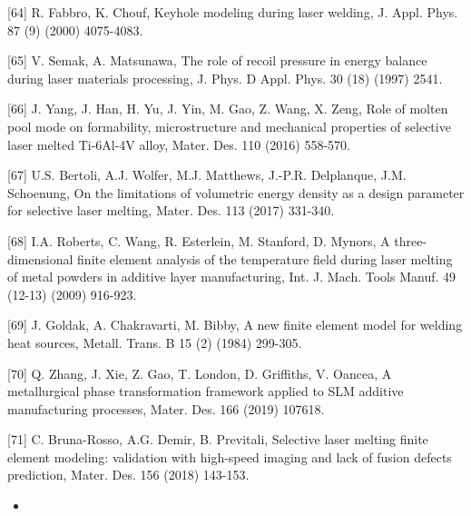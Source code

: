 \documentclass[10pt]{article}
\begin{document}
[64] R. Fabbro, K. Chouf, Keyhole modeling during laser welding, J. Appl. Phys. 87 (9) (2000) 4075-4083.

[65] V. Semak, A. Matsunawa, The role of recoil pressure in energy balance during laser materials processing, J. Phys. D Appl. Phys. 30 (18) (1997) 2541.

[66] J. Yang, J. Han, H. Yu, J. Yin, M. Gao, Z. Wang, X. Zeng, Role of molten pool mode on formability, microstructure and mechanical properties of selective laser melted Ti-6Al-4V alloy, Mater. Des. 110 (2016) 558-570.

[67] U.S. Bertoli, A.J. Wolfer, M.J. Matthews, J.-P.R. Delplanque, J.M. Schoenung, On the limitations of volumetric energy density as a design parameter for selective laser melting, Mater. Des. 113 (2017) 331-340.

[68] I.A. Roberts, C. Wang, R. Esterlein, M. Stanford, D. Mynors, A three-dimensional finite element analysis of the temperature field during laser melting of metal powders in additive layer manufacturing, Int. J. Mach. Tools Manuf. 49 (12-13) (2009) 916-923.

[69] J. Goldak, A. Chakravarti, M. Bibby, A new finite element model for welding heat sources, Metall. Trans. B 15 (2) (1984) 299-305.

[70] Q. Zhang, J. Xie, Z. Gao, T. London, D. Griffiths, V. Oancea, A metallurgical phase transformation framework applied to SLM additive manufacturing processes, Mater. Des. 166 (2019) 107618.

[71] C. Bruna-Rosso, A.G. Demir, B. Previtali, Selective laser melting finite element modeling: validation with high-speed imaging and lack of fusion defects prediction, Mater. Des. 156 (2018) 143-153.

\begin{itemize}
  \item 
\end{itemize}
\end{document}
